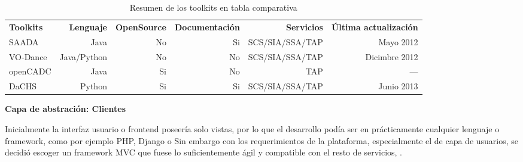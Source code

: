 \begin{table}[ht]
\centering
\caption{Resumen de los toolkits en tabla comparativa}
\begin{tabular}{lrrrrr}
    {\bf Toolkits} & {\bf Lenguaje} & {\bf OpenSource} & {\bf Documentación} & {\bf Servicios} & {\bf Última actualización}  \\
    SAADA          & Java           & No               & Si                  & SCS/SIA/SSA/TAP & Mayo 2012     \\
    VO-Dance       & Java/Python    & No               & No                  & SCS/SIA/SSA/TAP & Dicimbre 2012 \\
    openCADC       & Java           & Si               & No                  & TAP             & ---           \\
    DaCHS          & Python         & Si               & Si                  & SCS/SIA/SSA/TAP & Junio 2013    \\
\end{tabular}
\label{table:toolkits}
\end{table}

\textbf{Capa de abstración: Clientes}

Inicialmente la interfaz usuario o frontend poseería solo vistas, por lo que
el desarrollo podía ser en prácticamente cualquier lenguaje o framework, como por
ejemplo PHP, Django o {\ror} Sin embargo con los requerimientos de la
plataforma, especialmente el de capa de usuarios, se decidió escoger un
framework MVC que fuese lo suficientemente ágil y compatible con el resto de
servicios, {\ror}.
